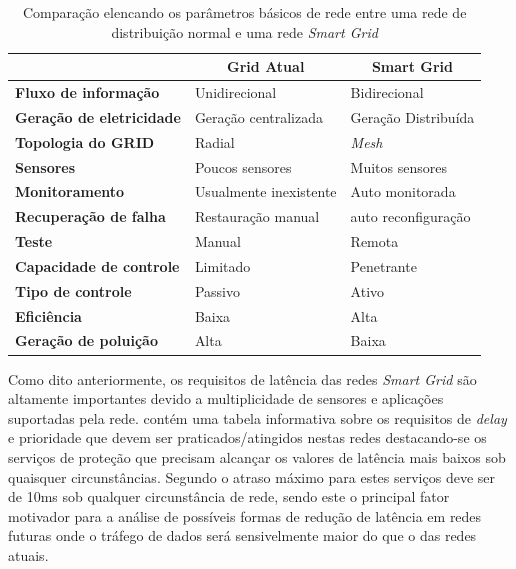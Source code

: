 \begin{table}[tbp]
\begin{tabular}{l|l|l|}
\cline{2-3}
 & \multicolumn{1}{c|}{\textbf{Grid Atual}} & \multicolumn{1}{c|}{\textbf{Smart Grid}} \\ \hline
\multicolumn{1}{|l|}{\textbf{Fluxo de informação}} & Unidirecional & Bidirecional \\ \hline
\multicolumn{1}{|l|}{\textbf{Geração de eletricidade}} & Geração centralizada & Geração Distribuída \\ \hline
\multicolumn{1}{|l|}{\textbf{Topologia do GRID}} & Radial & \emph{Mesh} \\ \hline
\multicolumn{1}{|l|}{\textbf{Sensores}} & Poucos sensores & Muitos sensores \\ \hline
\multicolumn{1}{|l|}{\textbf{Monitoramento}} & Usualmente inexistente & Auto monitorada \\ \hline
\multicolumn{1}{|l|}{\textbf{Recuperação de falha}} & Restauração manual & auto reconfiguração \\ \hline
\multicolumn{1}{|l|}{\textbf{Teste}} & Manual & Remota \\ \hline
\multicolumn{1}{|l|}{\textbf{Capacidade de controle}} & Limitado & Penetrante \\ \hline
\multicolumn{1}{|l|}{\textbf{Tipo de controle}} & Passivo & Ativo \\ \hline
\multicolumn{1}{|l|}{\textbf{Eficiência}} & Baixa & Alta \\ \hline
\multicolumn{1}{|l|}{\textbf{Geração de poluição}} & Alta & Baixa \\ \hline
\end{tabular}
\caption[Comparação entre GRIDS normal e \emph{Smart}]{Comparação elencando os parâmetros básicos de rede entre uma rede de distribuição normal e uma rede \emph{Smart Grid}}
\label{tab_comparacao_grids}
\end{table}

Como dito anteriormente, os requisitos de latência das redes \emph{Smart Grid} são altamente importantes devido a multiplicidade de sensores e aplicações suportadas pela rede. \cite{Art-Deshpande2011} contém uma tabela informativa sobre os requisitos de \emph{delay} e prioridade que devem ser praticados/atingidos nestas redes destacando-se os serviços de proteção que precisam alcançar os valores de latência mais baixos sob quaisquer circunstâncias. Segundo \cite{Art-Deshpande2011} o atraso máximo para estes serviços deve ser de 10ms sob qualquer circunstância de rede, sendo este o principal fator motivador para a análise de possíveis formas de redução de latência em redes futuras onde o tráfego de dados será sensivelmente maior do que o das redes atuais.

